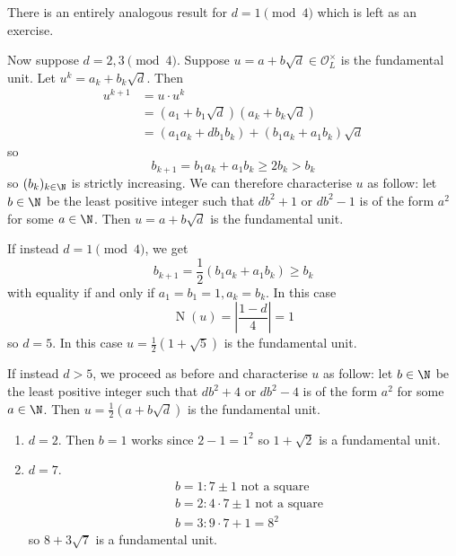 \documentclass[a4paper]{article}
\renewcommand*{\O}{\mathcal{O}}
\DeclareMathOperator{\n}{N}
\begin{document}
There is an entirely analogous result for \(d = 1 \pmod 4\) which is left as an exercise.

Now suppose \(d = 2, 3 \pmod 4\). Suppose \(u = a + b \sqrt d \in \O_L^\times\) is the fundamental unit. Let \(u^k = a_k + b_k \sqrt d\). Then
\begin{align*}
  u^{k + 1}
  &= u \cdot u^k \\
  &= (a_1 + b_1 \sqrt d)(a_k + b_k \sqrt d) \\
  &= (a_1a_k + d b_1b_k) + (b_1a_k + a_1b_k) \sqrt d
\end{align*}
so
\[
  b_{k + 1} = b_1a_k + a_1b_k \geq 2b_k > b_k
\]
so \((b_k)_{k \in \N}\) is strictly increasing. We can therefore characterise \(u\) as follow: let \(b \in \N\) be the least positive integer such that \(db^2 + 1\) or \(db^2 - 1\) is of the form \(a^2\) for some \(a \in \N\). Then \(u = a + b \sqrt d\) is the fundamental unit.

If instead \(d = 1 \pmod 4\), we get
\[
  b_{k + 1} = \frac{1}{2}(b_1a_k + a_1b_k) \geq b_k
\]
with equality if and only if \(a_1 = b_1 = 1, a_k = b_k\). In this case
\[
  \n(u) = \left| \frac{1 - d}{4} \right| = 1
\]
so \(d = 5\). In this case \(u = \frac{1}{2} (1 + \sqrt 5)\) is the fundamental unit.

If instead \(d > 5\), we proceed as before and characterise \(u\) as follow: let \(b \in \N\) be the least positive integer such that \(db^2 + 4\) or \(db^2 - 4\) is of the form \(a^2\) for some \(a \in \N\). Then \(u = \frac{1}{2} (a + b \sqrt d)\) is the fundamental unit.

\begin{eg}\leavevmode
  \begin{enumerate}
  \item \(d = 2\). Then \(b = 1\) works since \(2 - 1 = 1^2\) so \(1 + \sqrt 2\) is a fundamental unit.
  \item \(d = 7\).
    \begin{align*}
      & b = 1: 7 \pm 1 \text{ not a square} \\
      & b = 2: 4 \cdot 7 \pm 1 \text{ not a square} \\
      & b = 3: 9 \cdot 7 + 1 = 8^2
    \end{align*}
    so \(8 + 3 \sqrt 7\) is a fundamental unit.
  \end{enumerate}
\end{eg}


 
\end{document}
